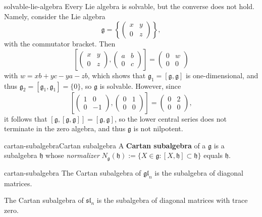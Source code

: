 \begin{example}{solvable-lie-algebra}
    Every  Lie algebra is solvable, but the converse does not hold. Namely, consider the Lie algebra
    \[ \mathfrak{g} = \left\{ \begin{pmatrix} x & y \\ 0 & z \end{pmatrix} \right\} , \]
    with the commutator bracket. Then
    \[ \left[ \begin{pmatrix} x & y \\ 0 & z \end{pmatrix}, \begin{pmatrix} a & b \\ 0 & c \end{pmatrix} \right] = \begin{pmatrix} 0 & w \\ 0 & 0 \end{pmatrix} \]
    with $w = xb + yc - ya - zb$, which shows that $\mathfrak{g}_1 = [\mathfrak{g}, \mathfrak{g}]$ is one-dimensional, and thus $\mathfrak{g}_2 = [\mathfrak{g}_1, \mathfrak{g}_1] = \{ 0 \}$, so $\mathfrak{g}$ is solvable. However, since
    \[ \left[ \begin{pmatrix} 1 & 0 \\ 0 & -1 \end{pmatrix}, \begin{pmatrix} 0 & 1 \\ 0 & 0 \end{pmatrix} \right] = \begin{pmatrix} 0 & 2 \\ 0 & 0 \end{pmatrix} , \]
    it follows that $[\mathfrak{g}, [\mathfrak{g}, \mathfrak{g}]] = [\mathfrak{g}, \mathfrak{g}]$, so the lower central series does not terminate in the zero algebra, and thus $\mathfrak{g}$ is not nilpotent.
\end{example}

\begin{topic}{cartan-subalgebra}{Cartan subalgebra}
    A \textbf{Cartan subalgebra} of a  $\mathfrak{g}$ is a  subalgebra $\mathfrak{h}$ whose \textit{normalizer} $N_\mathfrak{g}(\mathfrak{h}) := \{ X \in \mathfrak{g} : [X, \mathfrak{h}] \subset \mathfrak{h} \}$ equals $\mathfrak{h}$.
\end{topic}

\begin{example}{cartan-subalgebra}
    The Cartan subalgebra of $\mathfrak{gl}_n$ is the subalgebra of diagonal matrices.
    
    The Cartan subalgebra of $\mathfrak{sl}_n$ is the subalgebra of diagonal matrices with trace zero.
\end{example}

